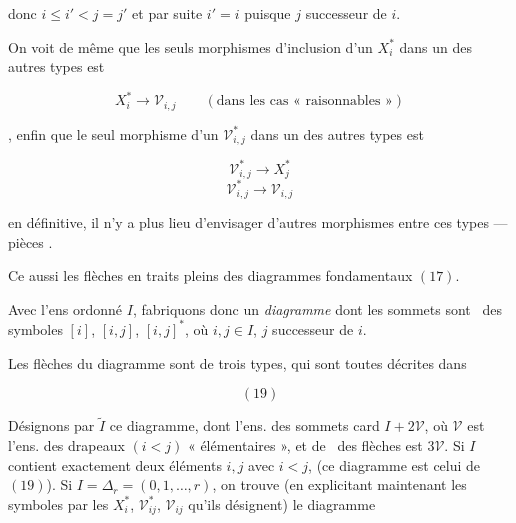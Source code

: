 \documentclass[11pt,a4paper]{article}
\begin{document}

donc $i \leq i' < j = j'$ et par suite $i' = i$ puisque $j$ successeur de $i$.

On voit de même que les seuls morphismes d'inclusion d'un $X_i^{*}$ dans un des
autres types est

\[
  X_i^{*} \longrightarrow \mathcal{V}_{i,j}
  \qquad (\text{dans les cas « raisonnables »})
\]

,  enfin que le seul morphisme d'un
$\mathcal{V}^{*}_{i,j}$ dans un des autres types est

\[
  \mathcal{V}^{*}_{i,j} \longrightarrow X_j^{*}
\]
\[
  \mathcal{V}^{*}_{i,j} \longrightarrow \mathcal{V}_{i,j}
\]


en définitive, il n'y a plus lieu d'envisager d'autres morphismes entre ces
types — pièces .

Ce  aussi les  flèches en traits pleins des
diagrammes fondamentaux $(17)$.

Avec l'ens ordonné $I$, fabriquons donc un 
\emph{diagramme} dont les sommets sont  \ill\ des
symboles $[i]$, $[i,j]$, $[i,j]^{*}$, où $i,j \in I$, $j$ successeur de $i$.

Les flèches du diagramme sont de trois types, qui sont toutes décrites dans

\[
  (19)
\]


Désignons par $\widetilde{I}$ ce diagramme, dont l'ens. des sommets
 \struck{\ill}  card
$I + 2\mathcal{V}$, \struck{\ill} où $\mathcal{V}$  est l'ens.
des drapeaux $(i<j)$ « élémentaires »,  et de \ill\ des flèches est $3\mathcal{V}$. Si $I$ contient
exactement deux éléments $i,j$ avec $i<j$,  (ce
diagramme est celui de $(19)$). Si $I = \Delta_r = (0,1,\ldots,r)$, on trouve
(en explicitant maintenant les symboles par les $X_i^{*}$,
$\mathcal{V}^{*}_{ij}$, $\mathcal{V}_{ij}$ qu'ils désignent) le diagramme
\end{document}
